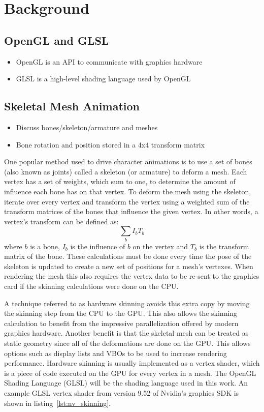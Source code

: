\section{Background}

\subsection{OpenGL and GLSL}
\begin{itemize}
 \item OpenGL is an API to communicate with graphics hardware
 \item GLSL is a high-level shading language used by OpenGL
\end{itemize}

\subsection{Skeletal Mesh Animation}
\begin{itemize}
 \item Discuss bones/skeleton/armature and meshes
 \item Bone rotation and position stored in a 4x4 transform matrix
\end{itemize}

One popular method used to drive character animations is to use a set of bones (also known as joints) called a skeleton (or armature) to deform a mesh. Each vertex has a set of weights, which sum to one, to determine the amount of influence each bone has on that vertex. To deform the mesh using the skeleton, iterate over every vertex and transform the vertex using a weighted sum of the transform matrices of the bones that influence the given vertex. In other words, a vertex's transform can be defined as:\[\sum_b{I_bT_b}\] where $b$ is a bone, $I_b$ is the influence of $b$ on the vertex and $T_b$ is the transform matrix of the bone. These calculations must be done every time the pose of the skeleton is updated to create a new set of positions for a mesh's vertexes. When rendering the mesh this also requires the vertex data to be re-sent to the graphics card if the skinning calculations were done on the CPU.

A technique referred to as hardware skinning avoids this extra copy by moving the skinning step from the CPU to the GPU. This also allows the skinning calculation to benefit from the impressive parallelization offered by modern graphics hardware. Another benefit is that the skeletal mesh can be treated as static geometry since all of the deformations are done on the GPU. This allows options such as display lists and VBOs to be used to increase rendering performance. Hardware skinning is usually implemented as a vertex shader, which is a piece of code executed on the GPU for every vertex in a mesh. The OpenGL Shading Language (GLSL) will be the shading language used in this work. An example GLSL vertex shader from version 9.52 of Nvidia's graphics SDK\cite{nvidiasdk} is shown in listing~\ref{lst:nv_skinning}.

